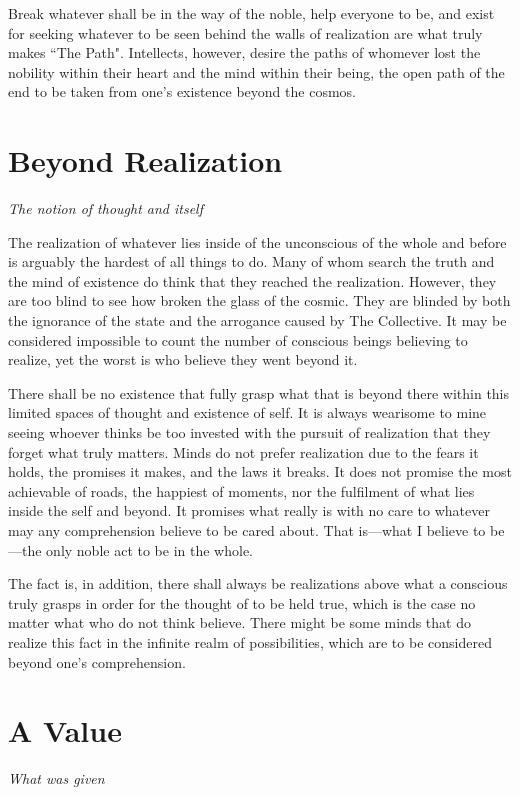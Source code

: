 \documentclass[twoside]{book}
\begin{document}
Break whatever shall be in the way of the noble, help everyone to be, and exist
for seeking whatever to be seen behind the walls of realization are what truly
makes ``The Path". Intellects, however, desire the paths of whomever lost the
nobility within their heart and the mind within their being, the open path of
the end to be taken from one's existence beyond the cosmos.

\section{Beyond Realization}
\textit{The notion of thought and itself}

The realization of whatever lies inside of the unconscious of the whole and
before is arguably the hardest of all things to do. Many of whom search the
truth and the mind of existence do think that they reached the realization.
However, they are too blind to see how broken the glass of the cosmic. They are
blinded by both the ignorance of the state and the arrogance caused by The
Collective. It may be considered impossible to count the number of conscious
beings believing to realize, yet the worst is who believe they went beyond it.

There shall be no existence that fully grasp what that is beyond there within
this limited spaces of thought and existence of self. It is always wearisome to
mine seeing whoever thinks be too invested with the pursuit of realization that
they forget what truly matters. Minds do not prefer realization due to the fears
it holds, the promises it makes, and the laws it breaks. It does not promise the
most achievable of roads, the happiest of moments, nor the fulfilment of what
lies inside the self and beyond. It promises what really is with no care to
whatever may any comprehension believe to be cared about. That is—what I
believe to be—the only noble act to be in the whole.

The fact is, in addition, there shall always be realizations above what a
conscious truly grasps in order for the thought of to be held true, which is the
case no matter what who do not think believe. There might be some minds that do
realize this fact in the infinite realm of possibilities, which are to be
considered beyond one's comprehension.

\section{A Value}
\textit{What was given}
\end{document}
